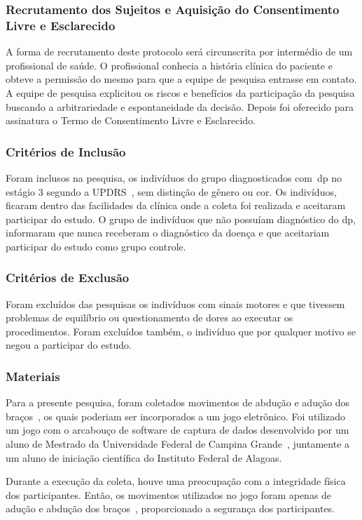 \subsubsection{Recrutamento dos Sujeitos e Aquisição do Consentimento Livre e Esclarecido}
A forma de recrutamento deste protocolo será circunscrita por intermédio de um profissional de saúde. O profissional conhecia a história clínica do paciente e obteve a permissão do mesmo para que a equipe de pesquisa entrasse em contato. A equipe de pesquisa explicitou os riscos e benefícios da participação da pesquisa buscando a arbitrariedade e espontaneidade da decisão. Depois foi oferecido para assinatura o Termo de Consentimento Livre e Esclarecido.

\subsubsection{Critérios de Inclusão}
Foram inclusos na pesquisa, os indivíduos do grupo diagnosticados com~\ac{dp} no estágio 3 segundo a UPDRS~\cite{updrs87}, sem distinção de gênero ou cor. Os indivíduos, ficaram dentro das facilidades da clínica onde a coleta foi realizada e aceitaram participar do estudo. O grupo de indivíduos que não possuíam diagnóstico do \ac{dp}, informaram que nunca receberam o diagnóstico da doença e que aceitariam participar do estudo como grupo controle.

\subsubsection{Critérios de Exclusão}
Foram excluídos das pesquisas os indivíduos com sinais motores e que tivessem problemas de equilíbrio ou questionamento de dores ao executar os procedimentos. Foram excluídos também, o indivíduo que por qualquer motivo se negou a participar do estudo.

\subsubsection{Materiais}
Para a presente pesquisa, foram coletados movimentos de abdução e adução dos braços~\cite{mcginnis2013biomechanics}, os quais poderiam ser incorporados a um jogo eletrônico. Foi utilizado um jogo com o arcabouço de software de captura de dados desenvolvido por um aluno de Mestrado da Universidade Federal de Campina Grande~\cite{antonio2013}, juntamente a um aluno de iniciação científica do Instituto Federal de Alagoas. 

Durante a execução da coleta, houve uma preocupação com a integridade física dos participantes. Então, os movimentos utilizados no jogo foram apenas de adução e abdução dos braços~\cite{mcginnis2013biomechanics}, proporcionado a segurança dos participantes. 

